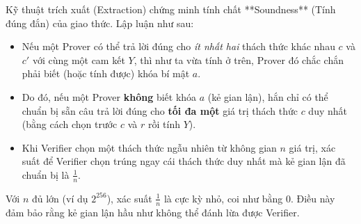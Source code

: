 Kỹ thuật trích xuất (Extraction) chứng minh tính chất **Soundness** (Tính đúng đắn) của giao thức.
Lập luận như sau:
\begin{itemize}
    \item Nếu một Prover có thể trả lời đúng cho \textit{ít nhất hai} thách thức khác nhau $c$ và $c'$ với cùng một cam kết $Y$, thì như ta vừa tính ở trên, Prover đó chắc chắn phải biết (hoặc tính được) khóa bí mật $a$.
    \item Do đó, nếu một Prover \textbf{không} biết khóa $a$ (kẻ gian lận), hắn chỉ có thể chuẩn bị sẵn câu trả lời đúng cho \textbf{tối đa một} giá trị thách thức $c$ duy nhất (bằng cách chọn trước $c$ và $r$ rồi tính $Y$).
    \item Khi Verifier chọn một thách thức ngẫu nhiên từ không gian $n$ giá trị, xác suất để Verifier chọn trúng ngay cái thách thức duy nhất mà kẻ gian lận đã chuẩn bị là $\frac{1}{n}$.
\end{itemize}
Với $n$ đủ lớn (ví dụ $2^{256}$), xác suất $\frac{1}{n}$ là cực kỳ nhỏ, coi như bằng 0. Điều này đảm bảo rằng kẻ gian lận hầu như không thể đánh lừa được Verifier.
